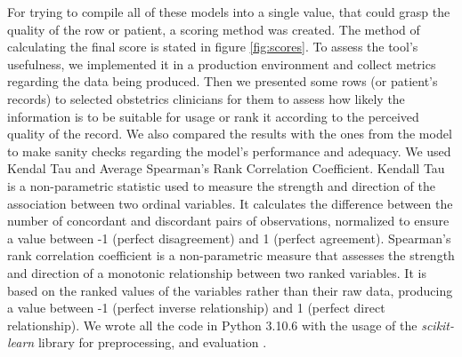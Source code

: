 For trying to compile all of these models into a single value, that could grasp the quality of the row or patient, a scoring method was created. The method of calculating the final score is stated in figure \ref{fig:scores}. To assess the tool’s usefulness, we implemented it in a production environment and collect metrics regarding the data being produced. Then we presented some rows (or patient's records) to selected obstetrics clinicians for them to assess how likely the information is to be suitable for usage or rank it according to the perceived quality of the record. We also compared the results with the ones from the model to make sanity checks regarding the model’s performance and adequacy. We used Kendal Tau and Average Spearman’s Rank Correlation Coefficient. Kendall Tau is a non-parametric statistic used to measure the strength and direction of the association between two ordinal variables. It calculates the difference between the number of concordant and discordant pairs of observations, normalized to ensure a value between -1 (perfect disagreement) and 1 (perfect agreement). Spearman’s rank correlation coefficient is a non-parametric measure that assesses the strength and direction of a monotonic relationship between two ranked variables. It is based on the ranked values of the variables rather than their raw data, producing a value between -1 (perfect inverse relationship) and 1 (perfect direct relationship).
We wrote all the code in Python 3.10.6 with the usage of the \textit{scikit-learn} library for preprocessing, and evaluation \cite{scikit-learn}.



 
